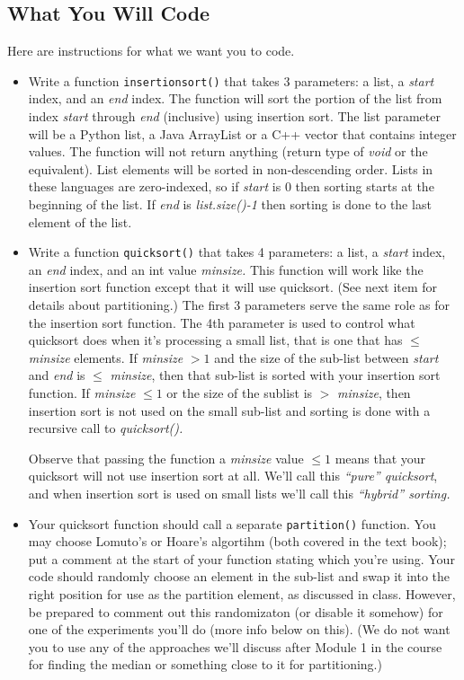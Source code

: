 \documentclass[11pt]{article}
\begin{document}
\subsection*{What You Will Code}
Here are instructions for what we want you to code.
\begin{itemize}

	\item Write a function {\tt insertionsort()} that takes 3 parameters: a list, a {\em start\/} index, and an {\em end\/} index. The function will sort the portion of the list from index {\em start\/} through {\em end\/} (inclusive) using insertion sort. The list parameter will be a Python list, a Java ArrayList or a C++ vector that contains integer values. The function will not return anything (return type of {\em void\/} or the equivalent). List elements will be sorted in non-descending order. Lists in these languages are zero-indexed, so if {\em start\/} is 0 then sorting starts at the beginning of the list.  If {\em end\/} is {\em{list.size()-1}} then sorting is done to the last element of the list.

	\item Write a function {\tt quicksort()} that takes 4 parameters: a list, a {\em start\/} index, an {\em end\/} index, and an int value {\em minsize.}  This function will work like the insertion sort function except that it will use quicksort. (See next item for details about partitioning.) The first 3 parameters serve the same role as for the insertion sort function. The 4th parameter is used to control what quicksort does when it's processing a small list, that is one that has $\leq$ {\em minsize} elements.  If {\em minsize} $> 1$ and the size of the sub-list between {\em start\/} and {\em end\/} is $\leq$ {\em minsize}, then that sub-list is sorted with your insertion sort function.  If {\em minsize} $\leq 1$ or the size of the sublist is $>$ {\em minsize}, then insertion sort is not used on the small sub-list and sorting is done with a recursive call to {\em quicksort().}
	
	Observe that passing the function a {\em minsize} value $\leq 1$ means that your quicksort will not use insertion sort at all.  We'll call this {\em ``pure'' quicksort\/}, and when insertion sort is used on small lists we'll call this {\em ``hybrid'' sorting.}
	
	\item Your quicksort function should call a separate {\tt partition()} function. You may choose Lomuto's or Hoare's algortihm (both covered in the text book); put a comment at the start of your function stating which you're using.  Your code should randomly choose an element in the sub-list and swap it into the right position for use as the partition element, as discussed in class.  However, be prepared to comment out this randomizaton (or disable it somehow) for one of the experiments you'll do (more info below on this).  (We do not want you to use any of the approaches we'll discuss after Module 1 in the course for finding the median or something close to it for partitioning.)


\end{itemize}
\end{document}
